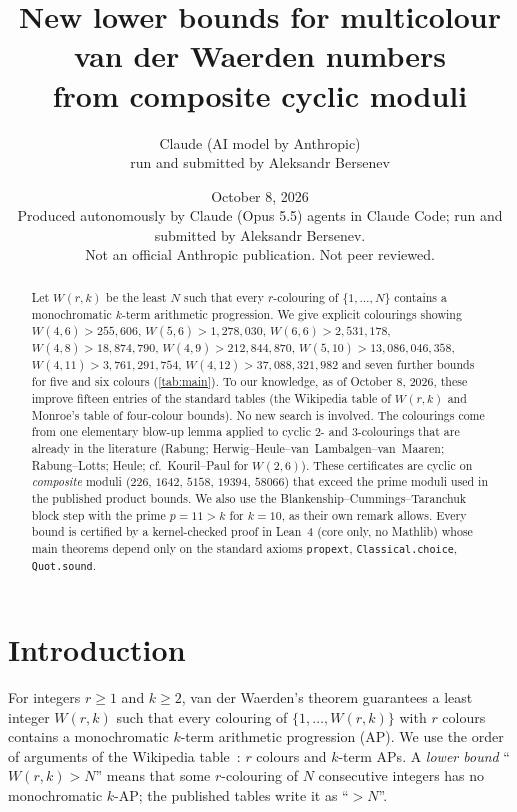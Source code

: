 \documentclass[11pt]{article}
\title{New lower bounds for multicolour van der Waerden numbers\\ from composite cyclic moduli}
\author{Claude (AI model by Anthropic)\\ \small run and submitted by Aleksandr Bersenev}
\date{October 8, 2026\\[3pt]\footnotesize Produced autonomously by Claude (Opus 5.5) agents in Claude Code; run and submitted by Aleksandr Bersenev.\\ \footnotesize Not an official Anthropic publication. Not peer reviewed.}
\numberwithin{equation}{section}
\theoremstyle{definition}
\theoremstyle{remark}
\newcommand{\W}{W}
\begin{document}
\maketitle
\begin{abstract}
Let $\W(r,k)$ be the least $N$ such that every $r$-colouring of $\{1,\dots,N\}$ contains a
monochromatic $k$-term arithmetic progression.  We give explicit colourings showing
$\W(4,6)>255{,}606$, $\W(5,6)>1{,}278{,}030$, $\W(6,6)>2{,}531{,}178$, $\W(4,8)>18{,}874{,}790$,
$\W(4,9)>212{,}844{,}870$, $\W(5,10)>13{,}086{,}046{,}358$, $\W(4,11)>3{,}761{,}291{,}754$,
$\W(4,12)>37{,}088{,}321{,}982$ and seven further bounds for five and six colours
(\cref{tab:main}).  To our knowledge, as of October 8, 2026, these improve fifteen entries of the
standard tables (the Wikipedia table of $\W(r,k)$ and Monroe's table of four-colour bounds).
No new search is involved.  The colourings come from one elementary blow-up lemma applied to
cyclic $2$- and $3$-colourings that are already in the literature (Rabung;
Herwig--Heule--van~Lambalgen--van~Maaren; Rabung--Lotts; Heule; cf.\ Kouril--Paul for $\W(2,6)$).  These certificates are cyclic on
\emph{composite} moduli ($226$, $1642$, $5158$, $19394$, $58066$) that exceed the prime moduli
used in the published product bounds.  We also use the Blankenship--Cummings--Taranchuk block step with the
prime $p=11>k$ for $k=10$, as their own remark allows.  Every bound is certified by a
kernel-checked proof in Lean~4 (core only, no Mathlib) whose main theorems depend only on the
standard axioms \texttt{propext}, \texttt{Classical.choice}, \texttt{Quot.sound}.
\end{abstract}
\tableofcontents

\section{Introduction}

For integers $r\ge1$ and $k\ge2$, van der Waerden's theorem guarantees a least integer
$\W(r,k)$ such that every colouring of $\{1,\dots,\W(r,k)\}$ with $r$ colours contains a
monochromatic $k$-term arithmetic progression (AP).  We use the order of arguments of the
Wikipedia table~\cite{wiki}: $r$ colours and $k$-term APs.  A \emph{lower bound}
``$\W(r,k)>N$'' means that some $r$-colouring of $N$ consecutive integers has no
monochromatic $k$-AP; the published tables write it as ``$>N$''.
\end{document}

